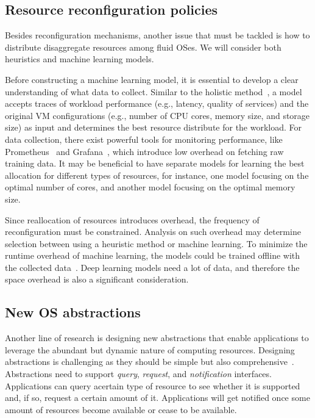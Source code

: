 \subsection{Resource reconfiguration policies}
Besides reconfiguration mechanisms, another issue that must be
tackled is how to distribute disaggregate resources among fluid
OSes.  We will consider both heuristics and machine learning models.

Before constructing a machine learning model, it is essential to
develop a clear understanding of what data to collect. Similar to
the holistic method~\cite{sedaghat2013virtual}, a model accepts
traces of workload performance (e.g., latency, quality of services)
and the original VM configurations (e.g., number of CPU cores,
memory size, and storage size) as input and determines the best
resource distribute for the workload.  For data collection, there
exist powerful tools for monitoring performance, like
Prometheus~\cite{sukhija2019towards} and Grafana~\cite{Grafana},
which introduce low overhead on fetching raw training data.  It may
be beneficial to have separate models for learning the best allocation
for different types of resources, for instance, one model focusing
on the optimal number of cores, and another model focusing on the
optimal memory size.

Since reallocation of resources introduces overhead,
the frequency of reconfiguration must be constrained.
Analysis on such overhead may determine
selection between using a heuristic method or machine learning.
To minimize the runtime overhead of machine learning,
the models could be trained offline with the collected
data~\cite{zhang2019learned}. Deep learning
models need a lot of data, and therefore the space overhead is also
a significant consideration.

\subsection{New OS abstractions}
Another line of research is designing new abstractions that enable
applications to leverage the abundant but dynamic nature of computing
resources.  Designing abstractions is challenging as they should be
simple but also comprehensive~\cite{lampson1983hints}.  Abstractions
need to support \emph{query}, \emph{request}, and \emph{notification}
interfaces. Applications can query acertain type of resource to see
whether it is supported and, if so, request a certain amount of it.
Applications will get notified once some amount of resources become
available or cease to be available.

